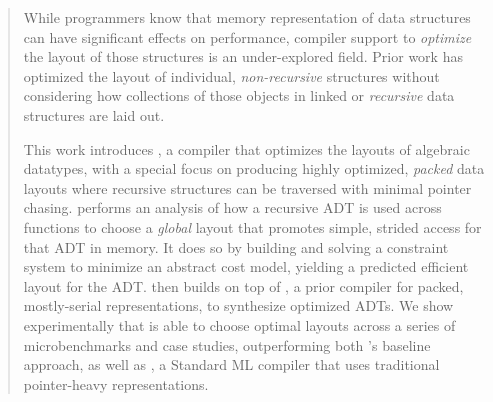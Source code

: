 
\begin{abstract}


While programmers know that memory representation of data structures can have significant effects
on performance, compiler support to {\em optimize} the layout of those structures is an under-explored field.
Prior work has optimized the layout of individual, \textit{non-recursive} structures without considering how
collections of those objects in linked or \textit{recursive} data structures are laid out.


This work introduces \system, a compiler that optimizes the layouts of algebraic datatypes, with a special focus
on producing highly optimized, {\em packed} data layouts where recursive structures can be traversed with minimal
pointer chasing. \system performs an analysis of how a recursive ADT is used across functions to choose a \textit{global} layout
that promotes simple, strided access for that ADT in memory. It does so by building and solving a constraint system
to minimize an abstract cost model, yielding a predicted efficient layout for the ADT. \system then builds on top
of \gibbon, a prior compiler for packed, mostly-serial representations, to synthesize optimized ADTs. We show experimentally 
that \system is able to choose optimal layouts across a series of microbenchmarks and case studies, outperforming both 
\gibbon's baseline approach, as well as \mlton, a Standard ML compiler that uses traditional
pointer-heavy representations.


%
%
  
\end{abstract}
